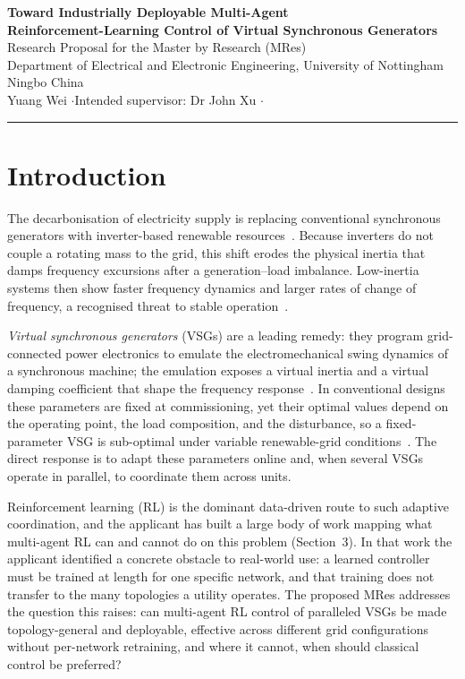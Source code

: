 \documentclass[11pt,a4paper]{article}
\begin{document}
\begin{center}
  {\Large\bfseries Toward Industrially Deployable Multi-Agent\\[2pt]
   Reinforcement-Learning Control of Virtual Synchronous Generators}\\[10pt]
  {\normalsize Research Proposal for the Master by Research (MRes)}\\[2pt]
  {\normalsize Department of Electrical and Electronic Engineering,
   University of Nottingham Ningbo China}\\[6pt]
  {\normalsize Yuang Wei \quad$\cdot$\quad Intended supervisor: Dr John Xu
   \quad$\cdot$}
\end{center}
\vspace{4pt}
\hrule
\vspace{8pt}

\section{Introduction}

The decarbonisation of electricity supply is replacing conventional
synchronous generators with inverter-based renewable
resources~\cite{iea_renewables_2024}. Because inverters do not couple a
rotating mass to the grid, this shift erodes the physical inertia that
damps frequency excursions after a generation--load imbalance.
Low-inertia systems then show faster frequency dynamics and larger rates
of change of frequency, a recognised threat to stable
operation~\cite{tielens2016inertia,milano2018foundations,markovic2021lowinertia}.

\emph{Virtual synchronous generators} (VSGs) are a leading remedy: they
program grid-connected power electronics to emulate the
electromechanical swing dynamics of a synchronous machine; the emulation exposes a
virtual inertia and a virtual damping coefficient that shape the
frequency response~\cite{zhong2011vsg,beck2007vsg,darco2015vsm}. In
conventional designs these parameters are fixed at commissioning, yet
their optimal values depend on the operating point, the load
composition, and the disturbance, so a fixed-parameter VSG is
sub-optimal under variable renewable-grid
conditions~\cite{bevrani2014vsg}. The direct response is to adapt these parameters online and, when
several VSGs operate in parallel, to coordinate them across units.

Reinforcement learning (RL) is the dominant data-driven route to such
adaptive coordination, and the applicant has built a large body of work
mapping what multi-agent RL can and cannot do on this problem
(Section~3). In that work the applicant identified a concrete obstacle
to real-world use: a learned controller must be trained at length for
one specific network, and that training does not transfer to the many
topologies a utility operates. The proposed MRes addresses the question
this raises: can multi-agent RL control of paralleled VSGs be made
topology-general and deployable, effective across different grid
configurations without per-network retraining, and where it cannot, when
should classical control be preferred?
\end{document}
